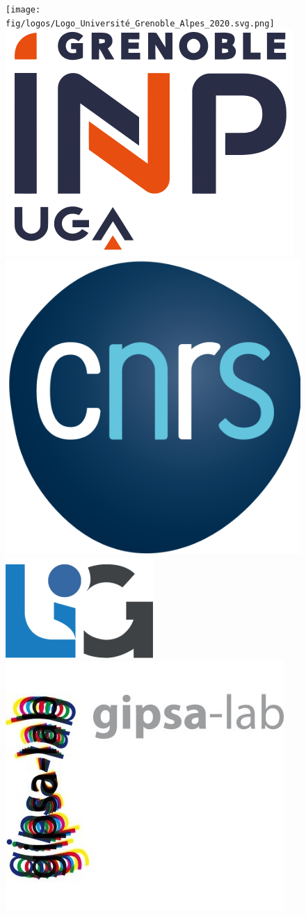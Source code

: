 \documentclass{beamer}
\begin{document}
\begin{frame}
    \titlepage
    \begin{figure}[htpb]
        \begin{center}
            \texttt{[image: fig/logos/Logo\_Université\_Grenoble\_Alpes\_2020.svg.png]}\quad\quad
            \includegraphics[width=0.1\linewidth]{fig/logos/logo_Grenoble_INP.png}\quad\quad
            \includegraphics[width=0.1\linewidth]{fig/logos/logo_cnrs.png}\quad\quad
            \includegraphics[width=0.1\linewidth]{fig/logos/Logo_LIG.png}\quad\quad
            \includegraphics[width=0.1\linewidth]{fig/logos/Logo_GIPSA-lab_Grenoble.jpg}
        \end{center}
    \end{figure}
\end{frame}
\end{document}
